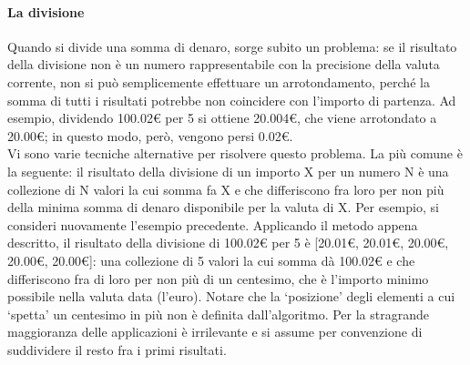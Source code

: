 \paragraph{La divisione}
Quando si divide una somma di denaro, sorge subito un problema: se il risultato della divisione non è un numero rappresentabile con la precisione della valuta corrente, non si può semplicemente effettuare un arrotondamento, perché la somma di tutti i risultati potrebbe non coincidere con l'importo di partenza. Ad esempio, dividendo 100.02\euro{} per 5 si ottiene 20.004\euro{}, che viene arrotondato a 20.00\euro{}; in questo modo, però, vengono persi 0.02\euro{}. \\
Vi sono varie tecniche alternative per risolvere questo problema. La più comune è la seguente: il risultato della divisione di un importo X per un numero N è una collezione di N valori la cui somma fa X e che differiscono fra loro per non più della minima somma di denaro disponibile per la valuta di X. Per esempio, si consideri nuovamente l'esempio precedente. Applicando il metodo appena descritto, il risultato della divisione di 100.02\euro{} per 5 è [20.01\euro{}, 20.01\euro{}, 20.00\euro{}, 20.00\euro{}, 20.00\euro{}]: una collezione di 5 valori la cui somma dà 100.02\euro{} e che differiscono fra di loro per non più di un centesimo, che è l'importo minimo possibile nella valuta data (l'euro). Notare che la \textquoteleft posizione\textquoteright{} degli elementi a cui \textquoteleft spetta\textquoteright{} un centesimo in più non è definita dall'algoritmo. Per la stragrande maggioranza delle applicazioni è irrilevante e si assume per convenzione di suddividere il resto fra i primi risultati.